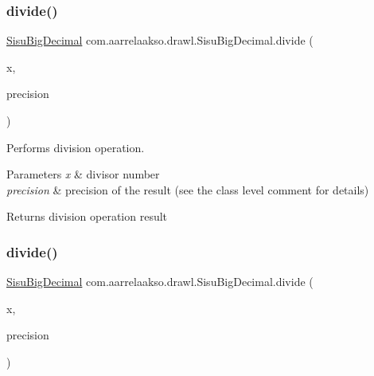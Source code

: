 \mbox{\label{classcom_1_1aarrelaakso_1_1drawl_1_1_sisu_big_decimal_ae205ef47f514e99e0ca571001ad1ea69}} 
\subsubsection{\texorpdfstring{divide()}{divide()}\hspace{0.1cm}{\footnotesize\ttfamily [2/3]}}
{\footnotesize\ttfamily \hyperlink{classcom_1_1aarrelaakso_1_1drawl_1_1_sisu_big_decimal}{Sisu\+Big\+Decimal} com.\+aarrelaakso.\+drawl.\+Sisu\+Big\+Decimal.\+divide (\begin{DoxyParamCaption}\item[{\hyperlink{classcom_1_1aarrelaakso_1_1drawl_1_1_sisu_big_decimal}{Sisu\+Big\+Decimal}}]{x,  }\item[{int}]{precision }\end{DoxyParamCaption})\hspace{0.3cm}{\ttfamily [protected]}}



Performs division operation. 


\begin{DoxyParams}{Parameters}
{\em x} & divisor number \\
\hline
{\em precision} & precision of the result (see the class level comment for details) \\
\hline
\end{DoxyParams}
\begin{DoxyReturn}{Returns}
division operation result 
\end{DoxyReturn}
\mbox{\label{classcom_1_1aarrelaakso_1_1drawl_1_1_sisu_big_decimal_a434a75dd442a5dc4ccb8a7af48ff4728}} 
\subsubsection{\texorpdfstring{divide()}{divide()}\hspace{0.1cm}{\footnotesize\ttfamily [3/3]}}
{\footnotesize\ttfamily \hyperlink{classcom_1_1aarrelaakso_1_1drawl_1_1_sisu_big_decimal}{Sisu\+Big\+Decimal} com.\+aarrelaakso.\+drawl.\+Sisu\+Big\+Decimal.\+divide (\begin{DoxyParamCaption}\item[{double}]{x,  }\item[{int}]{precision }\end{DoxyParamCaption})\hspace{0.3cm}{\ttfamily [protected]}}



